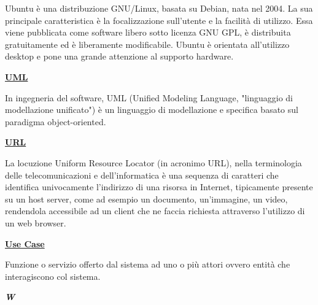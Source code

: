 \medskip
\begin{addmargin}[5em]{1em}
Ubuntu è una distribuzione GNU/Linux, basata su Debian, nata nel 2004. La sua principale caratteristica è la focalizzazione sull'utente e la facilità di utilizzo. Essa viene pubblicata come software libero sotto licenza GNU GPL, è distribuita gratuitamente ed è liberamente modificabile. Ubuntu è orientata all'utilizzo desktop e pone una grande attenzione al supporto hardware.
\end{addmargin}	

\bigskip
\begin{addmargin}[0em]{0em}	
	\textbf{\underline{UML}}
\end{addmargin}

\medskip
\begin{addmargin}[5em]{1em}
In ingegneria del software, UML (Unified Modeling Language, "linguaggio di modellazione unificato") è un linguaggio di modellazione e specifica basato sul paradigma object-oriented.
\end{addmargin}	

\bigskip
\begin{addmargin}[0em]{0em}	
	\textbf{\underline{URL}}
\end{addmargin}

\medskip
\begin{addmargin}[5em]{1em}
La locuzione Uniform Resource Locator (in acronimo URL), nella terminologia delle telecomunicazioni e dell'informatica è una sequenza di caratteri che identifica univocamente l'indirizzo di una risorsa in Internet, tipicamente presente su un host server, come ad esempio un documento, un'immagine, un video, rendendola accessibile ad un client che ne faccia richiesta attraverso l'utilizzo di un web browser.
\end{addmargin}
 
\bigskip
\begin{addmargin}[0em]{0em}
	\textbf{\underline{Use Case}} 
\end{addmargin}

\medskip
\begin{addmargin}[5em]{1em}
Funzione o servizio offerto dal sistema ad uno o più attori ovvero entità che interagiscono col sistema.
\end{addmargin}	

\newpage

\cleardoublepage
{}
{}
\noindent\hrulefill\hspace{4mm}\textbf{\textsl{\Huge{W}}}\hspace{4mm}\hrulefill
\vspace*{2\bigskipamount}

